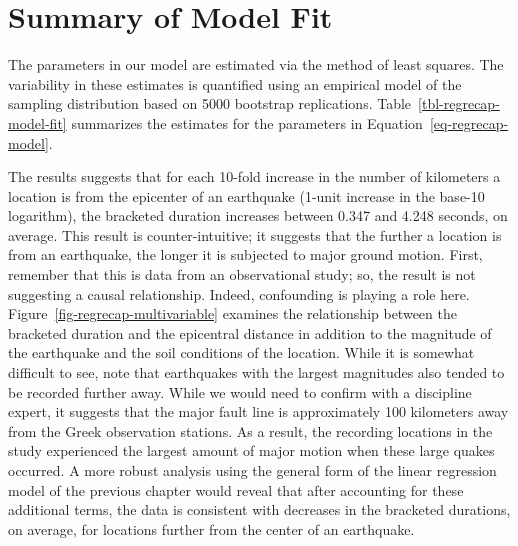 \documentclass[
  letterpaper,
  DIV=11,
  numbers=noendperiod]{scrreprt}
\theoremstyle{plain}
\theoremstyle{definition}
\theoremstyle{definition}
\theoremstyle{remark}
\begin{document}
\section{Summary of Model Fit}\label{summary-of-model-fit}

The parameters in our model are estimated via the method of least
squares. The variability in these estimates is quantified using an
empirical model of the sampling distribution based on 5000 bootstrap
replications. Table~\ref{tbl-regrecap-model-fit} summarizes the
estimates for the parameters in Equation~\ref{eq-regrecap-model}.

\begin{table}

\caption{\label{tbl-regrecap-model-fit}Summary of the model
characterizing the bracketed duration of seismic events in Greece as a
function of the epicentral distance.}


\end{table}%

The results suggests that for each 10-fold increase in the number of
kilometers a location is from the epicenter of an earthquake (1-unit
increase in the base-10 logarithm), the bracketed duration increases
between 0.347 and 4.248 seconds, on average. This result is
counter-intuitive; it suggests that the further a location is from an
earthquake, the longer it is subjected to major ground motion. First,
remember that this is data from an observational study; so, the result
is not suggesting a causal relationship. Indeed, confounding is playing
a role here. Figure~\ref{fig-regrecap-multivariable} examines the
relationship between the bracketed duration and the epicentral distance
in addition to the magnitude of the earthquake and the soil conditions
of the location. While it is somewhat difficult to see, note that
earthquakes with the largest magnitudes also tended to be recorded
further away. While we would need to confirm with a discipline expert,
it suggests that the major fault line is approximately 100 kilometers
away from the Greek observation stations. As a result, the recording
locations in the study experienced the largest amount of major motion
when these large quakes occurred. A more robust analysis using the
general form of the linear regression model of the previous chapter
would reveal that after accounting for these additional terms, the data
is consistent with decreases in the bracketed durations, on average, for
locations further from the center of an earthquake.
\end{document}
